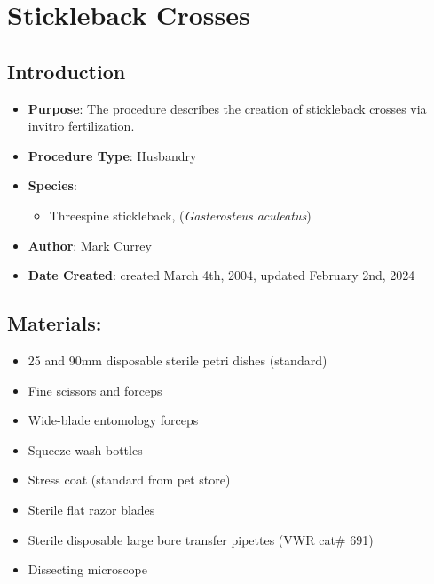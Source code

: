 \documentclass[
  letterpaper,
  DIV=11,
  numbers=noendperiod]{scrreprt}
\providecommand{\tightlist}{%
  \setlength{\itemsep}{0pt}\setlength{\parskip}{0pt}}\usepackage{longtable,booktabs,array}
\begin{document}
\hypertarget{sec-husbandry_stickleback_crossing}{%
\chapter{Stickleback Crosses}\label{sec-husbandry_stickleback_crossing}}

\hypertarget{introduction-27}{%
\section{Introduction}\label{introduction-27}}

\begin{itemize}
\tightlist
\item
  \textbf{Purpose}: The procedure describes the creation of stickleback
  crosses via invitro fertilization.
\item
  \textbf{Procedure Type}: Husbandry
\item
  \textbf{Species}:

  \begin{itemize}
  \tightlist
  \item
    Threespine stickleback, (\emph{Gasterosteus aculeatus})
  \end{itemize}
\item
  \textbf{Author}: Mark Currey
\item
  \textbf{Date Created}: created March 4th, 2004, updated February 2nd,
  2024
\end{itemize}

\hypertarget{materials-25}{%
\section{Materials:}\label{materials-25}}

\begin{itemize}
\tightlist
\item
  25 and 90mm disposable sterile petri dishes (standard)
\item
  Fine scissors and forceps
\item
  Wide-blade entomology forceps
\item
  Squeeze wash bottles
\item
  Stress coat (standard from pet store)
\item
  Sterile flat razor blades
\item
  Sterile disposable large bore transfer pipettes (VWR cat\# 691)
\item
  Dissecting microscope
\end{itemize}
\end{document}
